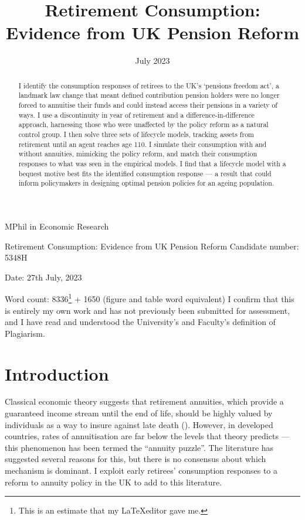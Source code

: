\documentclass[12pt]{article}
\date{July 2023}
\title{Retirement Consumption: Evidence from UK Pension Reform}
\begin{document}
\begin{titlepage}
  \begin{center}

    \normalsize
    {MPhil in Economic Research}
    \vfill

    \huge
    Retirement Consumption: Evidence from UK Pension Reform
    \vfill
    \normalsize
    Candidate number: 5348H

    Date: 27th July, 2023

    Word count: 8336\footnote{This is an estimate that my \LaTeX editor gave me.} + 1650 (figure and table word equivalent)
    \vfill
    I confirm that this is entirely my own work and has not previously been submitted for assessment, and I have read and understood the University's and Faculty's definition of Plagiarism.
  \end{center}
\end{titlepage}
\newpage
\maketitle
\begin{abstract}
  I identify the consumption responses of retirees to the UK's `pensions
  freedom act', a landmark law change that meant defined contribution pension
  holders were no longer forced to annuitise their funds and could instead
  access their pensions in a variety of ways. I use a discontinuity in year of
  retirement and a difference-in-difference approach, harnessing those who
  were unaffected by the policy reform as a natural control group. I then
  solve three sets of lifecycle models, tracking assets from retirement until an
  agent reaches age 110. I simulate their consumption with and without
  annuities, mimicking the policy reform, and match their consumption
  responses to what was seen in the empirical models. I find that a lifecycle
  model with a bequest motive best fits the identified consumption response —
  a result that could inform policymakers in designing optimal pension
  policies for an ageing population.
\end{abstract}
\newpage
\tableofcontents
\newpage

\section{Introduction}
Classical economic theory suggests that retirement annuities, which provide a
guaranteed income stream until the end of life, should be highly valued by
individuals as a way to insure against late death (\cite{yaari-65}). However, in
developed countries, rates of annuitisation are far below the levels that theory
predicts --- this phenomenon has been termed the ``annuity puzzle''. The literature
has suggested several reasons for this, but there is no consensus about which
mechanism is dominant. I exploit early retirees' consumption responses to a
reform to annuity policy in the UK to add to this literature.
\end{document}

